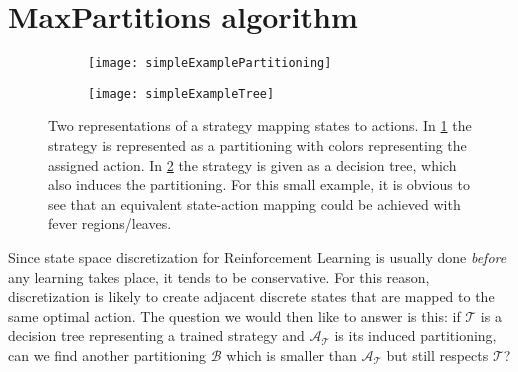 \section{MaxPartitions algorithm}%
\label{sec:maxParts}

\begin {figure} [t!]

    \centering
    \begin{subfigure}{0.4\textwidth}
        \texttt{[image: simpleExamplePartitioning]}%
        \caption{}%
        \label{fig:simpleExamplePartitioning}
    \end{subfigure}
    \begin{subfigure}{0.4\textwidth}
      \texttt{[image: simpleExampleTree]}%
      \caption{}%
      \label{fig:simpleExampleTree}
    \end{subfigure}

  \caption{%
    Two representations of a strategy mapping states to actions. In
    \cref{fig:simpleExamplePartitioning} the strategy is represented as a
    partitioning with colors representing the assigned action. In
    \cref{fig:simpleExampleTree} the strategy is given as a decision
    tree, which also induces the partitioning. For this small example, it is
    obvious to see that an equivalent state-action mapping could be achieved
    with fever regions/leaves.
  }%
  \label{fig:simpleExample}

\end {figure}

Since state space discretization for Reinforcement Learning is usually done
\textit{before} any learning takes place, it tends to be conservative. For this
reason, discretization is likely to create adjacent discrete states that are
mapped to the same optimal action. The question we would then like to answer is
this: if $\mathcal{T}$ is a decision tree representing a trained strategy and
$\mathcal{A}_{\mathcal{T}}$ is its induced partitioning, can we find another
partitioning $\mathcal{B}$ which is smaller than $\mathcal{A}_{\mathcal{T}}$ but
still respects $\mathcal{T}$?

